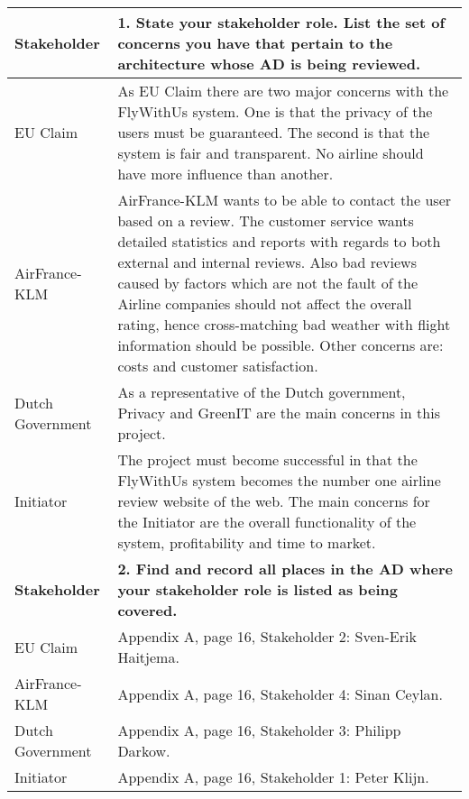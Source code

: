 \begin{longtable}{| l | p{13cm} |}
  \hline
  \textbf{Stakeholder} & \textbf{1. State your stakeholder role. List the set of concerns you have that pertain to the architecture whose AD is being reviewed.} \\
  \hline
  EU Claim & As EU Claim there are two major concerns with the FlyWithUs system. One is that the privacy of the users must be guaranteed. The second is that the system is fair and transparent. No airline should have more influence than another. \\
  \hline
  AirFrance-KLM & AirFrance-KLM wants to be able to contact the user based on a review. The customer service wants detailed statistics and reports with regards to both external and internal reviews. Also bad reviews caused by factors which are not the fault of the Airline companies should not affect the overall rating, hence cross-matching bad weather with flight information should be possible. Other concerns are: costs and customer satisfaction. \\
  \hline
  Dutch Government & As a representative of the Dutch government, Privacy and GreenIT are the main concerns in this project. \\
  \hline
  Initiator & The project must become successful in that the FlyWithUs system becomes the number one airline review website of the web. The main concerns for the Initiator are the overall functionality of the system, profitability and time to market. \\
  \hline

  \hline
  \textbf{Stakeholder} & \textbf{2. Find and record all places in the AD where your stakeholder role is listed as being covered.} \\
  \hline
  EU Claim & Appendix A, page 16, Stakeholder 2: Sven-Erik Haitjema. \\
  \hline
  AirFrance-KLM & Appendix A, page 16, Stakeholder 4: Sinan Ceylan. \\
  \hline
  Dutch Government & Appendix A, page 16, Stakeholder 3: Philipp Darkow. \\
  \hline
  Initiator & Appendix A, page 16, Stakeholder 1: Peter Klijn. \\
  \hline


\end{longtable}

